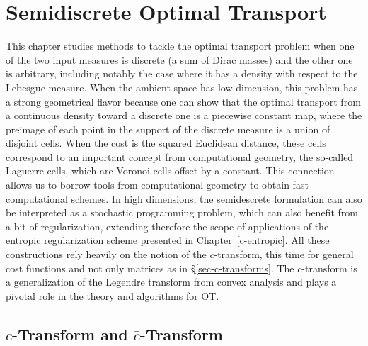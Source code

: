 
\chapter{Semidiscrete Optimal Transport}
\label{c-algo-semidiscr} 

This chapter studies methods to tackle the optimal transport problem when one of the two input measures is discrete (a sum of Dirac masses) and the other one is arbitrary, including notably the case where it has a density with respect to the Lebesgue measure.
%
When the ambient space has low dimension, this problem has a strong geometrical flavor because one can show that the optimal transport from a continuous density toward a discrete one is a piecewise constant map, where the preimage of each point in the support of the discrete measure is a union of disjoint cells.
% 
When the cost is the squared Euclidean distance, these cells correspond to an important concept from computational geometry, the so-called Laguerre cells, which are Voronoi cells offset by a constant. This connection allows us to borrow tools from computational geometry to obtain fast computational schemes.
%
In high dimensions, the semidescrete formulation can also be interpreted as a stochastic programming problem, which can also benefit from a bit of regularization, extending therefore the scope of applications of the entropic regularization scheme presented in Chapter~\ref{c-entropic}.
%
All these constructions rely heavily on the notion of the $c$-transform, this time for general cost functions and not only matrices as in \S\ref{sec-c-transforms}. The $c$-transform is a generalization of the Legendre transform from convex analysis and plays a pivotal role in the theory and algorithms for OT. 

\section{$c$-Transform and $\bar c$-Transform}
\label{s-c-transform}

